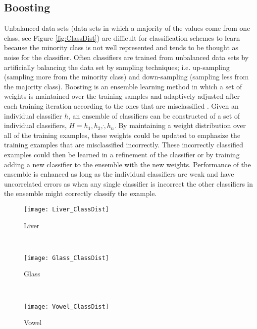 \subsection{Boosting}
Unbalanced data sets (data sets in which a majority of the values come from one class, see Figure \ref{fig:ClassDist}) are difficult for classification schemes to learn because the minority class is not well represented and tends to be thought as noise for the classifier.
Often classifiers are trained from unbalanced data sets by artificially balancing the data set by sampling techniques; i.e. up-sampling (sampling more from the minority class) and down-sampling (sampling less from the majority class).
Boosting is an ensemble learning method in which a set of weights is maintained over the training samples and adaptively adjusted after each training iteration according to the ones that are misclassified \cite{li_adaboost_2008}.
Given an individual classifier $h$, an ensemble of classifiers can be constructed of a set of individual classifiers, $H={h_1, h_2,\dot, h_n}$.
By maintaining a weight distribution over all of the training examples, these weights could be updated to emphasize the training examples that are misclassified incorrectly.  These incorrectly classified examples could then be learned in a refinement of the classifier or by training adding a new classifier to the ensemble with the new weights.
Performance of the ensemble is enhanced as long as the individual classifiers are weak and have uncorrelated errors as when any single classifier is incorrect the other classifiers in the ensemble might correctly classify the example.
\begin{figure*}[ht!]
	\centering
	\begin{subfigure}[b]{0.3\textwidth}
		\centering
		\texttt{[image: Liver\_ClassDist]}
        \caption{Liver}
	\end{subfigure}%
	~
	\begin{subfigure}[b]{0.3\textwidth}
		\centering
		\texttt{[image: Glass\_ClassDist]}
        \caption{Glass}
	\end{subfigure}	
    ~
	\begin{subfigure}[b]{0.3\textwidth}
		\centering
		\texttt{[image: Vowel\_ClassDist]}
        \caption{Vowel}
	\end{subfigure}%
	\caption{Distribution of Class Data}
	\label{fig:ClassDist}
\end{figure*}
